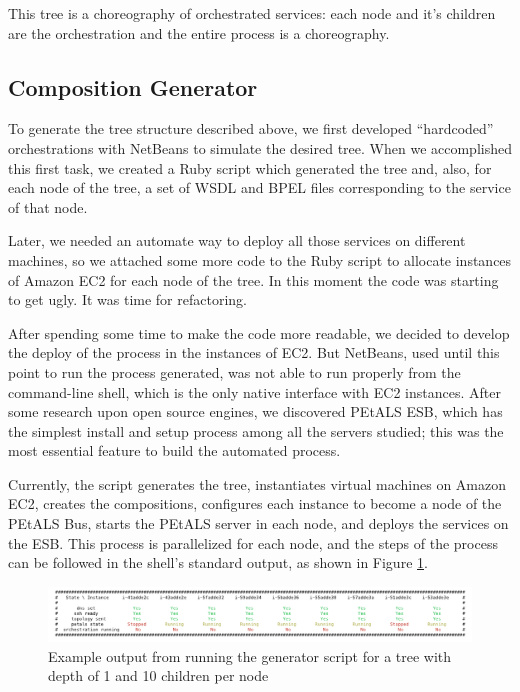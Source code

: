 This tree is a choreography of orchestrated services: each node and it's children are the orchestration and the entire process is a choreography.

\subsection{Composition Generator}
To generate the tree structure described above, we first developed ``hardcoded'' orchestrations with NetBeans to simulate the desired tree. When we accomplished this first task, we created a Ruby script which generated the tree and, also, for each node of the tree, a set of WSDL and BPEL files corresponding to the service of that node.

Later, we needed an automate way to deploy all those services on different machines, so we attached some more code to the Ruby script to allocate instances of Amazon EC2 for each node of the tree. In this moment the code was starting to get ugly. It was time for refactoring.

After spending some time to make the code more readable, we decided to develop the deploy of the process in the instances of EC2. But NetBeans, used until this point to run the process generated, was not able to run properly from the command-line shell, which is the only native interface with EC2 instances. After some research upon open source engines, we discovered PEtALS ESB, which has the simplest install and setup process among all the servers studied; this was the most essential feature to build the automated process.

Currently, the script generates the tree, instantiates virtual machines on Amazon EC2, creates the compositions, configures each instance to become a node of the PEtALS Bus, starts the PEtALS server in each node, and deploys the services on the ESB. This process is parallelized for each node, and the steps of the process can be followed in the shell's standard output, as shown in Figure \ref{generation-output}.

\begin{figure}[htb]
	\centering
	\includegraphics[trim= 10mm 0mm 10mm 0mm, clip, width=\textwidth]{images/generation-output}
	\caption{Example output from running the generator script for a tree with depth of 1 and 10 children per node}
	\label{generation-output}
\end{figure}

